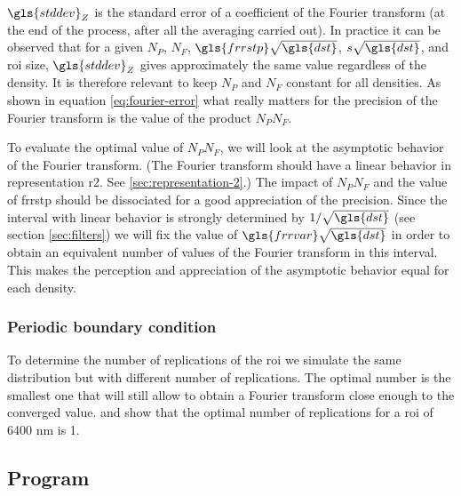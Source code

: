 {\bigskip

\( \gls{stddev}_Z \) is the standard error of a coefficient of the Fourier transform (at the end of the process, after all the averaging carried out).
In practice it can be observed that for a given \( N_P \), \( N_F \), \( \gls{frrstp} \sqrt{\gls{dst}} \), \( s \sqrt{\gls{dst}} \), and \gls{roi} size, \( \gls{stddev}_Z \) gives approximately the same value regardless of the density.
It is therefore relevant to keep \( N_P \) and \( N_F \) constant for all densities.
As shown in equation \eqref{eq:fourier-error} what really matters for the precision of the Fourier transform is the value of the product \( N_P N_F \).

\bigskip

To evaluate the optimal value of \( N_P N_F \), we will look at the asymptotic behavior of the Fourier transform.
(The Fourier transform should have a linear behavior in representation \acrshort{r2}. See \ref{sec:representation-2}.)
The impact of \( N_P N_F \) and the value of \gls{frrstp} should be dissociated for a good appreciation of the precision.
Since the interval with linear behavior is strongly determined by \( 1 / \sqrt{\gls{dst}} \) (see section \ref{sec:filters}) we will fix the value of \( \gls{frrvar} \sqrt{\gls{dst}} \) in order to obtain an equivalent number of values of the Fourier transform in this interval.
This makes the perception and appreciation of the asymptotic behavior equal for each density.

\subsubsection{Periodic boundary condition}

To determine the number of replications of the \gls{roi} we simulate the same distribution but with different number of replications.
The optimal number is the smallest one that will still allow to obtain a Fourier transform close enough to the converged value.
 and  show that the optimal number of replications for a \gls{roi} of 6400 nm is 1.

%
%

\subsection{Program}

}
